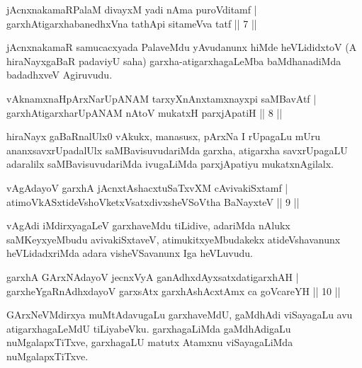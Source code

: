 
\begin{shl}
jAcnxnakamaRPalaM divayxM yadi nAma puroVditamf |\\
garxhAtigarxhabanedhxVna tathA\s pi sitameVva tatf \hfill || 7 || 
\end{shl}

\begin{artha}
jAcnxnakamaR samucacxyada PalaveMdu yAvudanunx hiMde heVLididxtoV (A hiraNayxgaBaR padaviyU saha) garxha-atigarxhagaLeMba baMdhanadiMda badadhxveV Agiruvudu.
\end{artha}

\begin{shl}
vAknamxnaHpArxNarUpANAM tarxyXnAnxtamxnayxpi saMBavAtf |\\
garxhAtigarxharUpANAM nAtoV mukatxH parxjApatiH \hfill || 8 ||
\end{shl}

\begin{artha}
hiraNayx gaBaRnalUlx0 vAkukx, manasusx, pArxNa I rUpagaLu mUru ananxsavxrUpadalUlx saMBavisuvudariMda garxha, atigarxha savxrUpagaLU adaralilx saMBavisuvudariMda ivugaLiMda parxjApatiyu mukatxnAgilalx.
\end{artha}

\begin{shl}
vAgAdayoV garxhA jAcnxtAshacxtuSaTxvXM cAvivakiSxtamf |\\
atimoVkASxtideVshoVketxVsatxdivxsheVSoV\s tha BaNayxteV \hfill || 9 ||
\end{shl}

\begin{artha}
vAgAdi iMdirxyagaLeV garxhaveMdu tiLidive, adariMda nAlukx saMKeyxyeMbudu avivakiSxtaveV, atimukitxyeMbudakekx atideVshavanunx heVLidadxriMda adara visheVSavanunx Iga heVLuvudu.
\end{artha}

\begin{shl}
garxhA GArxNAdayoV jecnxVyA ganAdhxdAyxsatxdatigarxhAH |\\
garxheYgaRnAdhxdayoV garxsAtx garxhAshAcx\s \s tAmx ca goVcareYH \hfill || 10 ||
\end{shl}

\begin{artha}
GArxNeVMdirxya muMtAdavugaLu garxhaveMdU, gaMdhAdi viSayagaLu avu atigarxhagaLeMdU tiLiyabeVku. garxhagaLiMda gaMdhAdigaLu nuMgalapxTiTxve, garxhagaLU matutx Atamxnu viSayagaLiMda nuMgalapxTiTxve.
\end{artha}

